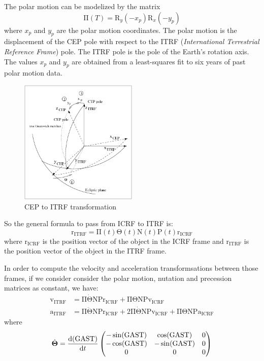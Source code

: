 \documentclass[10pt,a4paper]{article}
\newcommand{\GAST}{\ensuremath{\mathrm{GAST}}}
\newcommand{\vf}[1]{\boldsymbol{\mathrm{#1}}} %
\theoremstyle{definition}
\begin{document}
\begin{enumerate}
        The polar motion can be modelized by the matrix $$\vf{\Pi}(T)=\vf{R}_y(-x_p)\vf{R}_x(-y_p)$$
        where $x_p$ and $y_p$ are the polar motion coordinates. The polar motion is the displacement of the CEP pole with respect to the ITRF (\emph{International Terrestrial Reference Frame}) pole. The ITRF pole is the pole of the Earth's rotation axis. The values $x_p$ and $y_p$ are obtained from a least-squares fit to six years of past polar motion data.
        \begin{figure}[ht]
          \centering
          \includegraphics[width=0.5\textwidth]{Images/cepToITRF.png}
          \caption{CEP to ITRF transformation}
        \end{figure}
\end{enumerate}
So the general formula to pass from ICRF to ITRF is:
$$\vf{r}_\mathrm{ITRF}=\vf{\Pi}(t)\vf\Theta(t)\vf{N}(t)\vf{P}(t)\vf{r}_\mathrm{ICRF}$$
where $\vf{r}_\mathrm{ICRF}$ is the position vector of the object in the ICRF frame and $\vf{r}_\mathrm{ITRF}$ is the position vector of the object in the ITRF frame.

In order to compute the velocity and acceleration transformsations between those frames, if we consider consider the polar motion, nutation and precession matrices as constant, we have:
\begin{align*}
  \vf{v}_\mathrm{ITRF} & =\vf{\Pi}\dot{\vf\Theta}\vf{N}\vf{P}\vf{r}_\mathrm{ICRF}+\vf{\Pi}{\vf\Theta}\vf{N}\vf{P}\vf{v}_\mathrm{ICRF}                                                           \\
  \vf{a}_\mathrm{ITRF} & =\vf{\Pi}\ddot{\vf\Theta}\vf{N}\vf{P}\vf{r}_\mathrm{ICRF}+2\vf{\Pi}\dot{\vf\Theta}\vf{N}\vf{P}\vf{v}_\mathrm{ICRF}+\vf{\Pi}{\vf\Theta}\vf{N}\vf{P}\vf{a}_\mathrm{ICRF}
\end{align*}
where
\begin{align*}
  \dot{\vf\Theta} & =\dv{(\GAST)}{t}\begin{pmatrix}
                                      -\sin(\GAST) & \cos(\GAST)  & 0 \\
                                      -\cos(\GAST) & -\sin(\GAST) & 0 \\
                                      0            & 0            & 0
                                    \end{pmatrix} \\
\end{align*}
\end{document}
